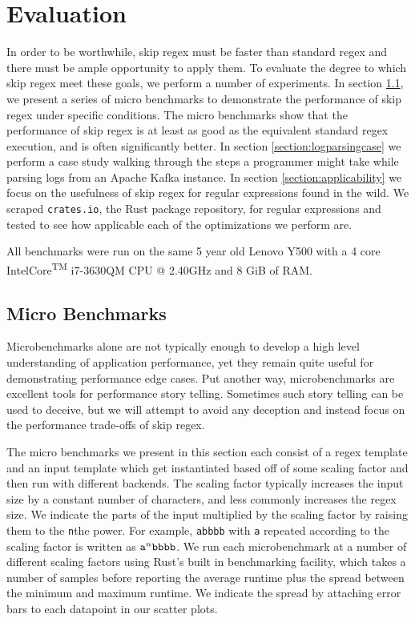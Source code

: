 \chapter{Evaluation}
\label{chapter:evaluation}

In order to be worthwhile, skip regex must be faster than standard
regex and there must be ample opportunity to apply them. To evaluate
the degree to which skip regex meet these goals, we perform a number
of experiments. In section \ref{section:microbenchmarks}, we present a
series of micro benchmarks to demonstrate
the performance of skip regex under specific conditions. The micro
benchmarks show that the performance of skip regex is
at least as good as the equivalent standard regex execution, and 
is often significantly better.
In section \ref{section:logparsingcase} we perform a case study walking
through the steps a programmer might take while parsing logs from
an Apache Kafka instance.
In section \ref{section:applicability} we focus on the usefulness of
skip regex for regular expressions found in the wild. We scraped
\verb'crates.io', the Rust package repository,
for regular expressions and tested to see how applicable each of the 
optimizations we perform are. 

All benchmarks were run
on the same 5 year old Lenovo Y500 with a 4 core
Intel\textregistered Core\textsuperscript{TM} i7-3630QM CPU @
2.40GHz and 8 GiB of RAM.

\section{Micro Benchmarks}
\label{section:microbenchmarks}

Microbenchmarks alone are not typically enough to develop a high
level understanding of application performance, yet they remain
quite useful for demonstrating performance edge cases. Put another
way, microbenchmarks are excellent tools for performance story
telling. Sometimes such story telling can be used to deceive,
but we will attempt to avoid any deception and instead focus
on the performance trade-offs of skip regex.

The micro benchmarks we present in this section each consist of
a regex template and an input template which get instantiated
based off of some scaling factor and then run with different
backends. The scaling factor typically increases the input
size by a constant number of characters, and less commonly
increases the regex size. We indicate the parts of the
input multiplied by the scaling factor by raising them
to the \verb'n'the power. For example, \verb'abbbb' with \verb'a'
repeated according to the scaling factor is written as
${\tt a}^n{\tt bbbb}$. We run each microbenchmark at a
number of different scaling factors using Rust's built in
benchmarking facility, which takes a number of samples before
reporting the average runtime plus the spread between the minimum
and maximum runtime. We indicate the spread by attaching error bars to
each datapoint in our scatter plots.

